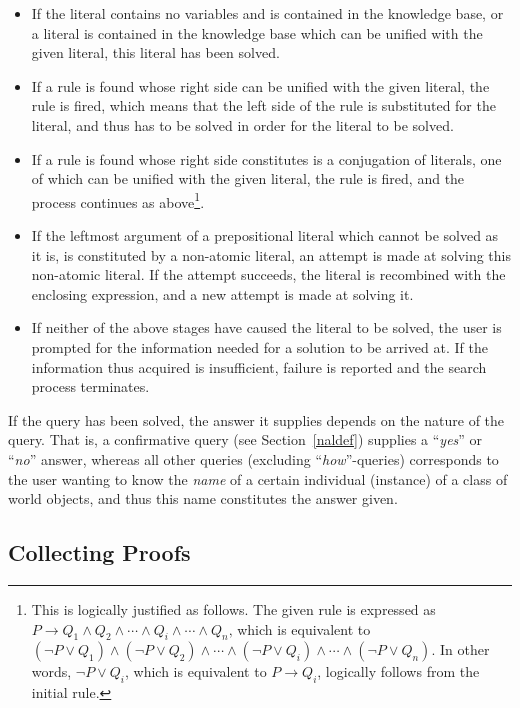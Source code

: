 \begin{itemize}
\item If the literal contains no variables and is contained in the
  knowledge base, or a literal is contained in the knowledge base
  which can be unified with the given literal, this literal has been
  solved.
\item If a rule is found whose right side can be unified with the
  given literal, the rule is fired, which means that the left side of
  the rule is substituted for the literal, and thus has to be solved
  in order for the literal to be solved.
\item If a rule is found whose right side constitutes is a
  conjugation of literals, one of which can be unified with the given
  literal, the rule is fired, and the process continues as
  above\footnote{This is logically justified as follows. The given
  rule is expressed as \(P\rightarrow Q_1\wedge Q_2\wedge\cdots\wedge
  Q_{i}\wedge\cdots\wedge Q_{n}\mbox{,}\) which is equivalent to
  \((\neg P\vee Q_1)\wedge(\neg P\vee Q_2)\wedge\cdots\wedge(\neg
  P\vee Q_{i})\wedge\cdots\wedge(\neg P\vee Q_{n})\). In other words,
  \(\neg P\vee Q_{i}\), which is equivalent to \(P\rightarrow Q_{i}\),
  logically follows from the initial rule.}.
\item If the leftmost argument of a prepositional literal which
  cannot be solved as it is, is constituted by a non-atomic literal,
  an attempt is made at solving this non-atomic literal. If the
  attempt succeeds, the literal is recombined with the enclosing
  expression, and a new attempt is made at solving it. 
\item If neither of the above stages have caused the literal to be
  solved, the user is prompted for the information needed for a
  solution to be arrived at. If the information thus acquired is
  insufficient, failure is reported and the search process terminates.
\end{itemize}
If the query has been solved, the answer it supplies depends on the
nature of the query. That is, a confirmative query (see
Section~\ref{naldef}) supplies a ``{\em yes\/}'' or ``{\em no\/}''
answer, whereas all other queries (excluding ``{\em how\/}''-queries)
corresponds to the user wanting to know the {\em name\/} of a certain
individual (instance) of a class of world objects, and thus this name
constitutes the answer given.

\subsection{Collecting Proofs}
\label{proof}

